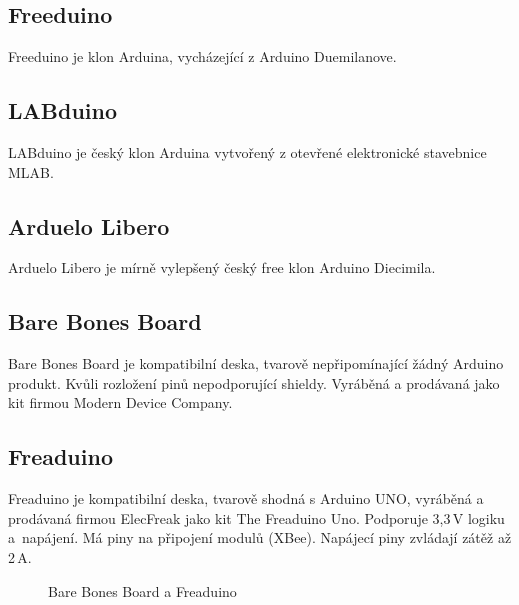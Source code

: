 	\subsection{Freeduino} 
	Freeduino je klon Arduina, vycházející z Arduino Duemilanove.
	
	\subsection{LABduino} 
	LABduino je český klon Arduina vytvořený z otevřené elektronické stavebnice MLAB.
	
	\subsection{Arduelo Libero}	
	Arduelo Libero je mírně vylepšený český free klon Arduino Diecimila.
	
	\subsection{Bare Bones Board} 
	Bare Bones Board je kompatibilní deska, tvarově nepřipomínající žádný Arduino produkt. Kvůli rozložení pinů nepodporující shieldy. Vyráběná a prodávaná jako kit firmou Modern Device Company.
	
	\subsection{Freaduino} 
	Freaduino je kompatibilní deska, tvarově shodná s Arduino UNO, vyráběná a prodávaná firmou ElecFreak jako kit The Freaduino Uno. Podporuje 3,3\,V logiku a~napájení. Má piny na připojení modulů (XBee). Napájecí piny zvládají zátěž až 2\,A.

	\begin{figure}[!ht]
	\vspace{-10pt}	
    \centering
			\hspace*{5mm}
					\caption{Bare Bones Board a Freaduino}
					\vspace{-20pt}	
	\end{figure}	
	
